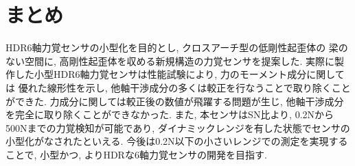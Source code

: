\section{まとめ}
HDR6軸力覚センサの小型化を目的とし, クロスアーチ型の低剛性起歪体の
梁のない空間に, 高剛性起歪体を収める新規構造の力覚センサを提案した. 
実際に製作した小型HDR6軸力覚センサは性能試験により, 力のモーメント成分に関しては
優れた線形性を示し, 他軸干渉成分の多くは較正を行なうことで取り除くことができた. 
力成分に関しては較正後の数値が飛躍する問題が生じ, 他軸干渉成分を完全に取り除くことができなかった. 
また, 本センサはSN比より, 0.2Nから500Nまでの力覚検知が可能であり, 
ダイナミックレンジを有した状態でセンサの小型化がなされたといえる. 
今後は0.2N以下の小さいレンジでの測定を実現することで, 小型かつ, 
よりHDRな6軸力覚センサの開発を目指す.